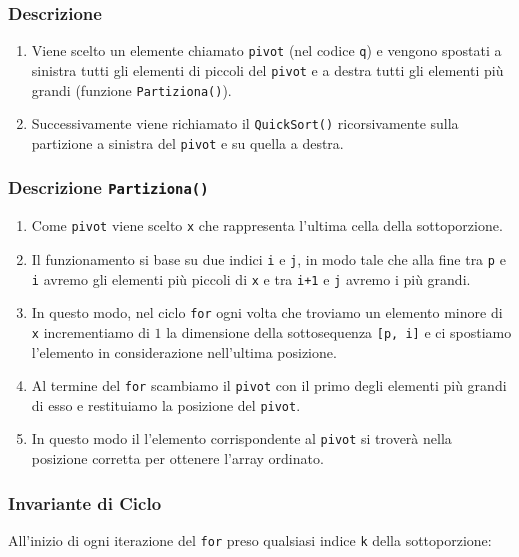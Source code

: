 \documentclass{article}
\begin{document}
\subsubsection{Descrizione}

\begin{enumerate}
    \item Viene scelto un elemente chiamato \verb|pivot| (nel codice \verb|q|) e vengono spostati a sinistra tutti gli elementi di piccoli del \verb|pivot| e a destra tutti gli elementi più grandi (funzione \verb|Partiziona()|).
    \item Successivamente viene richiamato il \verb|QuickSort()| ricorsivamente sulla partizione a sinistra del \verb|pivot| e su quella a destra.
\end{enumerate}

\cprotect\subsubsection{Descrizione \verb|Partiziona()|}

\begin{enumerate}
    \item Come \verb|pivot| viene scelto \verb|x| che rappresenta l'ultima cella della sottoporzione.
    \item Il funzionamento si base su due indici \verb|i| e \verb|j|, in modo tale che alla fine tra \verb|p| e \verb|i| avremo gli elementi più piccoli di \verb|x| e tra \verb|i+1| e \verb|j| avremo i più grandi.
    \item In questo modo, nel ciclo \verb|for| ogni volta che troviamo un elemento minore di \verb|x| incrementiamo di $1$ la dimensione della sottosequenza \verb|[p, i]| e ci spostiamo l'elemento in considerazione nell'ultima posizione.
    \item Al termine del \verb|for| scambiamo il \verb|pivot| con il primo degli elementi più grandi di esso e restituiamo la posizione del \verb|pivot|.
    \item In questo modo il l'elemento corrispondente al \verb|pivot| si troverà nella posizione corretta per ottenere l'array ordinato.
\end{enumerate}

\subsubsection{Invariante di Ciclo}

All'inizio di ogni iterazione del \verb|for| preso qualsiasi indice \verb|k| della sottoporzione:
\end{document}

